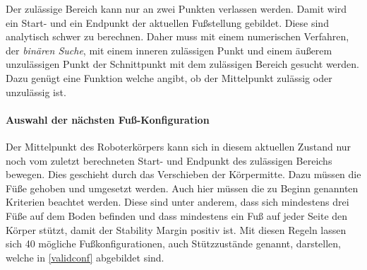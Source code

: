 Der zulässige Bereich kann nur an zwei Punkten verlassen werden. Damit wird ein Start- und ein Endpunkt der aktuellen Fußstellung gebildet. Diese sind analytisch schwer zu berechnen. Daher muss mit einem numerischen Verfahren, der \emph{binären Suche}, mit einem inneren zulässigen Punkt und einem äußerem unzulässigen Punkt der Schnittpunkt mit dem zulässigen Bereich gesucht werden. Dazu genügt eine Funktion welche angibt, ob der Mittelpunkt zulässig oder unzulässig ist.

\paragraph{Auswahl der nächsten Fuß-Konfiguration}

Der Mittelpunkt des Roboterkörpers kann sich in diesem aktuellen Zustand nur noch vom zuletzt berechneten Start- und Endpunkt des zulässigen Bereichs bewegen. Dies geschieht durch das Verschieben der Körpermitte. Dazu müssen die Füße gehoben und umgesetzt werden. Auch hier müssen die zu Beginn genannten Kriterien beachtet werden. Diese sind unter anderem, dass sich mindestens drei Füße auf dem Boden befinden und dass mindestens ein Fuß auf jeder Seite den Körper stützt, damit der Stability Margin positiv ist. Mit diesen Regeln lassen sich 40 mögliche Fußkonfigurationen, auch Stützzustände genannt, darstellen, welche in \autoref{validconf} abgebildet sind.

